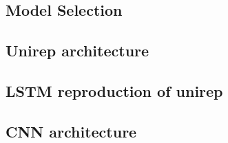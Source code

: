 \subsection{Model Selection}


\subsection{Unirep architecture}

\subsection{LSTM reproduction of unirep}

\subsection{CNN architecture}



